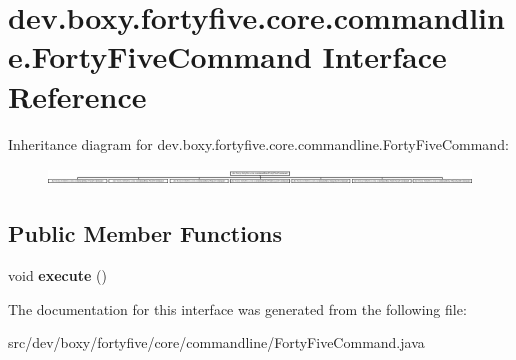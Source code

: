 \hypertarget{interfacedev_1_1boxy_1_1fortyfive_1_1core_1_1commandline_1_1_forty_five_command}{
\section{dev.boxy.fortyfive.core.commandline.FortyFiveCommand Interface Reference}
\label{d0/d06/interfacedev_1_1boxy_1_1fortyfive_1_1core_1_1commandline_1_1_forty_five_command}
}
Inheritance diagram for dev.boxy.fortyfive.core.commandline.FortyFiveCommand:\begin{figure}[H]
\begin{center}
\leavevmode
\includegraphics[height=0.451977cm]{d0/d06/interfacedev_1_1boxy_1_1fortyfive_1_1core_1_1commandline_1_1_forty_five_command}
\end{center}
\end{figure}
\subsection*{Public Member Functions}
\begin{DoxyCompactItemize}
\item 
\hypertarget{interfacedev_1_1boxy_1_1fortyfive_1_1core_1_1commandline_1_1_forty_five_command_a37061a93f8c8e532b324b708248b5b7e}{
void {\bfseries execute} ()}
\label{d0/d06/interfacedev_1_1boxy_1_1fortyfive_1_1core_1_1commandline_1_1_forty_five_command_a37061a93f8c8e532b324b708248b5b7e}

\end{DoxyCompactItemize}


The documentation for this interface was generated from the following file:\begin{DoxyCompactItemize}
\item 
src/dev/boxy/fortyfive/core/commandline/FortyFiveCommand.java\end{DoxyCompactItemize}
